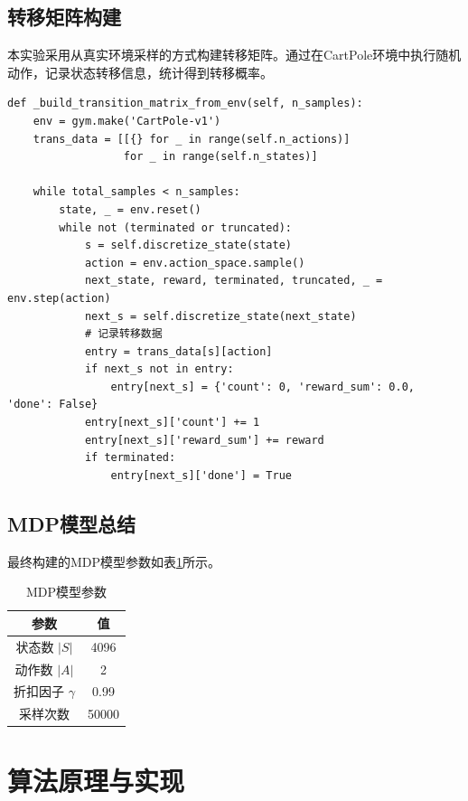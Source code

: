 \documentclass[12pt,a4paper]{article}
\begin{document}
\subsection{转移矩阵构建}

本实验采用从真实环境采样的方式构建转移矩阵。通过在CartPole环境中执行随机动作，记录状态转移信息，统计得到转移概率。

\begin{lstlisting}[caption={从真实环境采样构建转移矩阵}]
def _build_transition_matrix_from_env(self, n_samples):
    env = gym.make('CartPole-v1')
    trans_data = [[{} for _ in range(self.n_actions)] 
                  for _ in range(self.n_states)]
    
    while total_samples < n_samples:
        state, _ = env.reset()
        while not (terminated or truncated):
            s = self.discretize_state(state)
            action = env.action_space.sample()
            next_state, reward, terminated, truncated, _ = env.step(action)
            next_s = self.discretize_state(next_state)
            # 记录转移数据
            entry = trans_data[s][action]
            if next_s not in entry:
                entry[next_s] = {'count': 0, 'reward_sum': 0.0, 'done': False}
            entry[next_s]['count'] += 1
            entry[next_s]['reward_sum'] += reward
            if terminated:
                entry[next_s]['done'] = True
\end{lstlisting}

\subsection{MDP模型总结}

最终构建的MDP模型参数如表\ref{tab:mdp_params}所示。

\begin{table}[H]
\centering
\caption{MDP模型参数}
\label{tab:mdp_params}
\begin{tabular}{cc}
\toprule
\textbf{参数} & \textbf{值} \\
\midrule
状态数 $|S|$ & 4096 \\
动作数 $|A|$ & 2 \\
折扣因子 $\gamma$ & 0.99 \\
采样次数 & 50000 \\
\bottomrule
\end{tabular}
\end{table}

\section{算法原理与实现}
\end{document}
